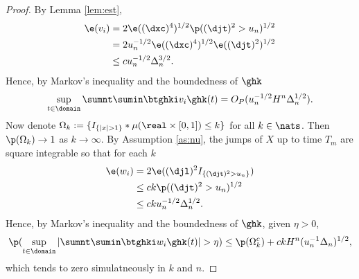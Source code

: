 \begin{proof}
\begin{comment}
    \begin{align}
      \p &\left(  \sup_{t \in \domain}\vert x_n (t) \vert  > \delta\right) \le \p(v_n > \delta/2) + \p(w_n > \delta/2) \notag. 
      \label{}
    \end{align}
  Now let  $\varepsilon > 0$ be given and note that because  $\Lambda$ is almost surely finite,   there is a sufficiently large $K > 0$ such that $\p(\Lambda > K) \le \varepsilon/2$. Hence, 
\end{comment}
By Lemma \ref{lem:est},
\begin{align} 
  \e(v_i) & = 2 \e( (\dxc)^4)^{1/2} \p( (\djt)^2 > u_n)^{1/2} \notag \\ 
  & = 2 u_n^{-1/2} \e( (\dxc)^4)^{1/2} \e( (\djt)^2)^{1/2} \notag \\ 
  & \le c u_n^{-1/2}\Delta_n^{3/2} \label{eq:vi}.
\end{align}
Hence,  by Markov's inequality and the boundedness of $\ghk$ \begin{align} \sup_{t \in \domain}\sumnt \sumin \btghki v_i \ghk(t) = O_P(u_n^{-1/2}H^n \Delta_n^{1/2}).\end{align} 
Now denote $\Omega_k := \{ I_{\{\vert x \vert > 1\}} \ast \mu(\real \times [0,1]) \le k\}$ for all $k \in \nats$. Then $\p(\Omega_k) \to 1$ as $k \to \infty$.
By Assumption \ref{as:nu}, the jumps of $X$ up to time $T_m$ are square integrable so that for each $k$
\begin{align}
  \e(w_i) &= 2 \e((\djl)^2 I_{\{(\djt)^2 > u_n\}})\notag\\
  &\le c k  \p((\djt)^2 > u_n)^{1/2}\notag\\
  &\le c k  u^{-1/2}_n \Delta_n^{1/2}. 
  \label{}
\end{align}
Hence,  by Markov's inequality and the boundedness of $\ghk$, given $\eta > 0$, \begin{align} \p( \sup_{t \in \domain}\vert \sumnt \sumin \btghki w_i \ghk(t)\vert > \eta) \le \p(\Omega_k^c) + ckH^n (u^{-1}_n\Delta_n)^{1/2}, \notag \end{align}
which tends to zero simulatneously in $k$ and $n$.
  \begin{comment}
\p(v_n > \delta /2) & \le 2cKH_n\delta^{-1}E(n^{-1} \log(n) \sumin I_{\{(\djt)^2 > u_n\}}) + \p(\Lambda > K) \notag  \\ & = 2cK H_n\delta^{-1}\log(n) \p( (\Delta_{1/n}J^s)^2 > u_n)  + \varepsilon/2 \notag \\ &\le  2cK H_n\delta^{-1}\log(n) E((\Delta_{1/n} J^s)^2))u_n^{-1}   + \varepsilon/2 \notag \\ &\le 2cKH_n\delta^{-1} \log(n) n^{-1}\kappa u_n^{-1} +  \varepsilon/2\label{eq:asabove} \end{align} where $\kappa := E((\Delta_1 J^s)^2)) < \infty$.  Obviously there is a large enough $n$ such that the first expression above is less than or equal to $\varepsilon/2$.

\end{comment}
\end{proof}
